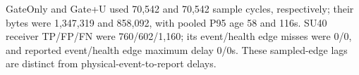 GateOnly and Gate+U used 70,542 and 70,542 sample cycles, respectively; their bytes were 1,347,319 and 858,092, with pooled P95 age 58 and 116s. SU40 receiver TP/FP/FN were 760/602/1,160; its event/health edge misses were 0/0, and reported event/health edge maximum delay 0/0s. These sampled-edge lags are distinct from physical-event-to-report delays.
